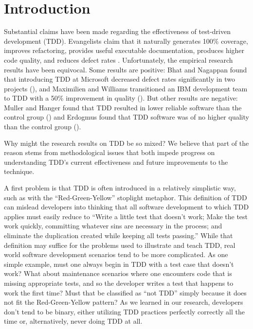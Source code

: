 \documentclass[smallextended]{svjour3}     %
\begin{document}
\section{Introduction}
\label{intro}

Substantial claims have been made regarding the effectiveness of
test-driven development (TDD). Evangelists claim that it naturally
generates 100\% coverage, improves refactoring, provides useful executable
documentation, produces higher code quality, and reduces defect rates
\cite{Beck:03}.  Unfortunately, the empirical research results
have been equivocal.  Some results are positive: Bhat and Nagappan
found that introducing TDD at Microsoft decreased defect rates significantly in two projects
(\cite{Bhat:06}), and Maximilien and Williams transitioned an IBM development
team to TDD with a 50\% improvement in quality (\cite{Maximilien:03}). But other
results are negative: Muller and Hanger found that TDD resulted in lower
reliable software than the control group (\cite{Muller:02}) and Erdogmus
found that TDD software was of no higher quality than the control group
(\cite{Erdogmus:05}).

Why might the research results on TDD be so mixed?  We believe that part of
the reason stems from methodological issues that both impede progress on
understanding TDD's current effectiveness and future improvements to the technique. 

A first problem is that TDD is often introduced in a relatively simplistic
way, such as with the ``Red-Green-Yellow'' stoplight metaphor.  This
definition of TDD can mislead developers into thinking that all software
development to which TDD applies must easily reduce to ``Write a little test that
doesn't work; Make the test work quickly, committing whatever sins are
necessary in the process; and eliminate the duplication created while
keeping all tests passing.''  While that definition may suffice for the 
problems used to illustrate and teach TDD, real world software development
scenarios tend to be more complicated. As one simple example, must one
always begin in TDD with a test case that doesn't work? What about
maintenance scenarios where one encounters code that is missing appropriate
tests, and so the developer writes a test that happens to work the first
time?  Must that be classified as ``not TDD'' simply because it does not
fit the Red-Green-Yellow pattern?  As we learned in our research,
developers don't tend to be binary, either utilizing TDD practices
perfectly correctly all the time or, alternatively, never doing TDD at all.
\end{document}
